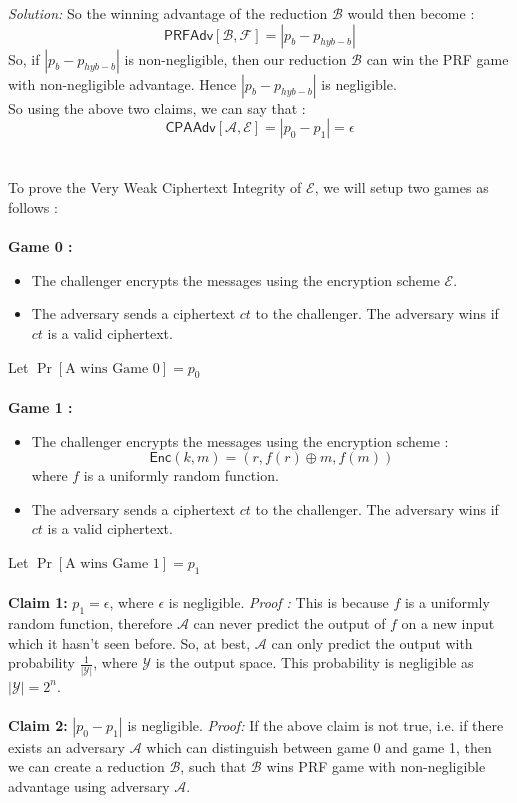 \documentclass[a4paper, 11pt]{article}
\newenvironment{solution}
    {\textit{Solution:}}
    {\clearpage}
\newcommand{\enc}{\mathsf{Enc}}
\newcommand{\prf}{\mathsf{PRFAdv}}
\newcommand{\calA}{\mathcal{A}}
\newcommand{\calB}{\mathcal{B}}
\newcommand{\calE}{\mathcal{E}}
\newcommand{\calF}{\mathcal{F}}
\newcommand{\calY}{\mathcal{Y}}
\begin{document}
\begin{solution}
    So the winning advantage of the reduction $\calB$ would then become :
    $$\prf[\calB, \calF] = | p_{b} - p_{hyb-b} |$$ So, if $| p_{b} - p_{hyb-b} |$ is non-negligible, then our reduction $\calB$ can win the PRF game with non-negligible advantage. Hence $| p_{b} - p_{hyb-b} |$ is negligible.\\
    So using the above two claims, we can say that :
    $$\mathsf{CPAAdv}[\calA, \calE] = |p_0 - p_1| = \epsilon$$ \\ \\
    To prove the Very Weak Ciphertext Integrity of $\calE$, we will setup two games as follows : \\ \\
    \textbf{Game 0 :}
    \begin{itemize}
        \item The challenger encrypts the messages using the encryption scheme $\calE$.
        \item The adversary sends a ciphertext $ct$ to the challenger. The adversary wins if $ct$ is a valid ciphertext.
    \end{itemize}
    Let $\Pr[\text{A wins Game 0}] = p_0$ \\ \\
    \textbf{Game 1 :}
    \begin{itemize}
        \item The challenger encrypts the messages using the encryption scheme :
              $$\enc(k, m) = (r, f(r) \oplus m, f(m))$$ where $f$ is a uniformly random function.
        \item The adversary sends a ciphertext $ct$ to the challenger. The adversary wins if $ct$ is a valid ciphertext.
    \end{itemize}
    Let $\Pr[\text{A wins Game 1}] = p_1$ \\ \\
    \textbf{Claim 1: } $p_1 = \epsilon$, where $\epsilon$ is negligible.
    \textit{Proof : } This is because $f$ is a uniformly random function, therefore $\calA$ can never predict the output of $f$ on a new input which it hasn't seen before. So, at best, $\calA$ can only predict the output with probability $\frac{1}{|\calY|}$, where $\calY$ is the output space. This probability is negligible as $|\calY| = 2^n$. \\ \\
    \textbf{Claim 2: } $|p_0 - p_1|$ is negligible.
    \textit{Proof:} If the above claim is not true, i.e. if there exists an adversary $\calA$ which can distinguish between game 0 and game 1, then we can create a reduction $\calB$, such that $\calB$ wins PRF game with non-negligible advantage using adversary $\calA$. \\

\end{solution}
\end{document}
